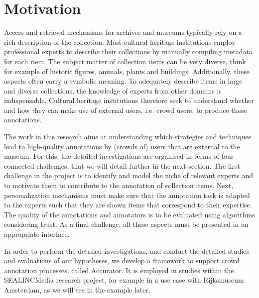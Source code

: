 \section{Motivation}\label{motivation}
Access and retrieval mechanisms for archives and museums typically rely on a rich description of the collection. 
Most cultural heritage institutions employ professional experts to describe their collections by manually compiling metadata for each item. 
The subject matter of collection items can be very diverse, think for example of historic figures, animals, plants and buildings. Additionally, these aspects often carry a symbolic meaning.
To adequately describe items in large and diverse collections, the knowledge of experts from other domains is indispensable.
Cultural heritage institutions therefore seek to understand whether and how they can make use of external users, i.e. crowd users, to produce these annotations.

The work in this research aims at understanding which strategies and techniques lead to high-quality annotations by (crowds of) users that are external to the museum. For this, the detailed investigations are organised in terms of four connected challenges, that we will detail further in the next section. The first challenge in the project is to identify and model the niche of relevant experts and to motivate them to contribute to the annotation of collection items. 
Next, personalization mechanisms must make sure that the annotation task is adapted to the experts such that they are shown items that correspond to their expertise. 
The quality of the annotations and annotators is to be evaluated using algorithms considering trust. As a final challenge, all these aspects must be presented in an appropriate interface.

In order to perform the detailed investigations, and conduct the detailed studies and evaluations of our hypotheses, we develop a framework to support crowd annotation processes, called Accurator. It is employed in studies within the SEALINCMedia research project, for example in a use case with Rijksmuseum Amsterdam, as we will see in the example later. 